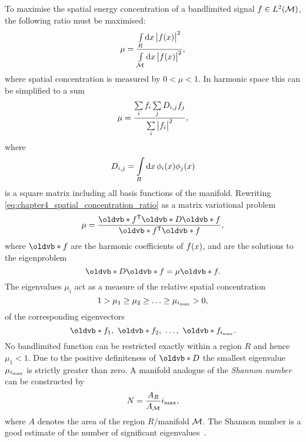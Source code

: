 To maximise the spatial energy concentration of a bandlimited signal \(f \in L^{2}(\mathcal{M})\), the following ratio must be maximised:
%
\begin{equation}
	\mu
	= \frac{\int\limits_{R} \dd{x} \big\lvert f(x)\big\rvert^{2}}{\int\limits_{\mathcal{M}} \dd{x} \big\lvert f(x)\big\rvert^{2}},
\end{equation}
%
where spatial concentration is measured by \(0 < \mu < 1\).
In harmonic space this can be simplified to a sum
%
\begin{equation}\label{eq:chapter4_spatial_concentration_ratio}
	\mu
	= \frac{\sum\limits_{i} f_{i} \sum\limits_{j} D_{i,j} f_{j}}{\sum\limits_{i} \big\lvert f_{i}\big\rvert^{2}},
\end{equation}
%
where
%
\begin{equation}
	D_{i,j}
	= \int\limits_{R} \dd{x} \phi_{i}(x) \phi_{j}(x)
\end{equation}
%
is a square matrix including all basis functions of the manifold.
Rewriting \cref{eq:chapter4_spatial_concentration_ratio} as a matrix variational problem
%
\begin{equation}
	\mu
	= \frac{\transpose{\vb{f}} \vb{D} \vb{f}}{\transpose{\vb{f}} \vb{f}},
\end{equation}
%
where \(\vb{f}\) are the harmonic coefficients of \(f(x)\), and are the solutions to the eigenproblem
%
\begin{equation}\label{eq:chapter4_eigenproblem}
	\vb{D}\vb{f}
	= \mu \vb{f}.
\end{equation}
%
The eigenvalues \(\mu_{i}\) act as a measure of the relative spatial concentration
%
\begin{equation}
	1 > \mu_{1} \geq \mu_{2} \geq \ldots \geq \mu_{\imax} > 0, %
\end{equation}
%
of the corresponding eigenvectors
%
\begin{equation}
	\vb{f}_{1},\ \vb{f}_{2},\ \ldots,\ \vb{f}_{\imax}.
\end{equation}
%
No bandlimited function can be restricted exactly within a region \(R\) and hence \(\mu_{1}<1\).
Due to the positive definiteness of \(\vb{D}\) the smallest eigenvalue \(\mu_{i_{\text{max}}}\) is strictly greater than zero.
A manifold analogue of the \emph{Shannon number} can be constructed by
%
\begin{equation}
	N
	= \frac{A_{R}}{A_{\mathcal{M}}} i_{\text{max}},
\end{equation}
%
where \(A\) denotes the area of the region \(R\)/manifold \(\mathcal{M}{}\).
The Shannon number is a good estimate of the number of significant eigenvalues~\cite{Percival1993}.

